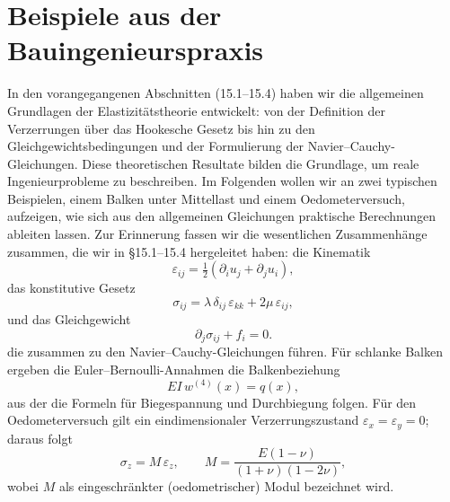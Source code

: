%
%
%
%
\section{Beispiele aus der Bauingenieurspraxis}
\label{elastomechanik:section:teil4}
In den vorangegangenen Abschnitten (15.1–15.4) haben wir die allgemeinen Grundlagen der Elastizitätstheorie entwickelt: 
von der Definition der Verzerrungen über das Hookesche Gesetz bis hin zu den Gleichgewichtsbedingungen und der Formulierung der Navier--Cauchy-Gleichungen. 
Diese theoretischen Resultate bilden die Grundlage, um reale Ingenieurprobleme zu beschreiben. 
Im Folgenden wollen wir an zwei typischen Beispielen, einem Balken unter Mittellast und einem Oedometerversuch, aufzeigen, wie sich aus den allgemeinen Gleichungen praktische Berechnungen ableiten lassen. 
Zur Erinnerung fassen wir die wesentlichen Zusammenhänge zusammen, die wir in \S15.1–15.4 hergeleitet haben:
die Kinematik
\[
  \varepsilon_{ij} = \tfrac12(\partial_i u_j + \partial_j u_i),
\]
das konstitutive Gesetz
\[
  \sigma_{ij} = \lambda\, \delta_{ij}\,\varepsilon_{kk} + 2\mu\, \varepsilon_{ij},
\]
und das Gleichgewicht
\[
  \partial_j \sigma_{ij} + f_i = 0.
\]
die zusammen zu den Navier--Cauchy-Gleichungen führen.
Für schlanke Balken ergeben die Euler--Bernoulli-Annahmen die Balkenbeziehung
\[
  EI\, w^{(4)}(x) = q(x),
\]
aus der die Formeln für Biegespannung und Durchbiegung folgen.
Für den Oedometerversuch gilt ein eindimensionaler Verzerrungszustand
\(\varepsilon_x=\varepsilon_y=0\); daraus folgt
\[
  \sigma_z = M \,\varepsilon_z, \qquad
  M=\frac{E(1-\nu)}{(1+\nu)(1-2\nu)},
\]
wobei \(M\) als eingeschränkter (oedometrischer) Modul bezeichnet wird.
\]
